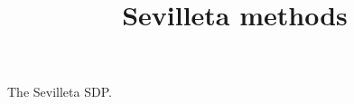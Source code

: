 \documentclass{article}
\begin{document}
  \title{Sevilleta methods}

  \maketitle

  The Sevilleta SDP.
\end{document}

